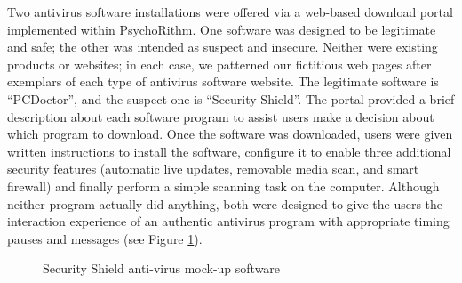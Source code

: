 Two antivirus software installations were offered via a web-based download portal implemented within PsychoRithm. One software was designed to be legitimate and safe; the other was intended as suspect and insecure. Neither were existing products or websites; in each case, we patterned our fictitious web pages after exemplars of each type of antivirus software website.  The legitimate software is ``PCDoctor'', and the suspect one is ``Security Shield''. The portal provided a brief description about each software program to assist users make a decision about which program to download. Once the software was downloaded, users were given written instructions to install the software, configure it to enable three additional security features (automatic live updates, removable media scan, and smart firewall) and finally perform a simple scanning task on the computer. Although neither program actually did anything, both were designed to give the users the interaction experience of an authentic antivirus program with appropriate timing pauses and messages (see Figure \ref{fig:rogueav}).  

\begin{figure}[!pbt]
  \centering
  \hfill
  \caption{Security Shield anti-virus mock-up software}
  \label{fig:rogueav}
\end{figure}

